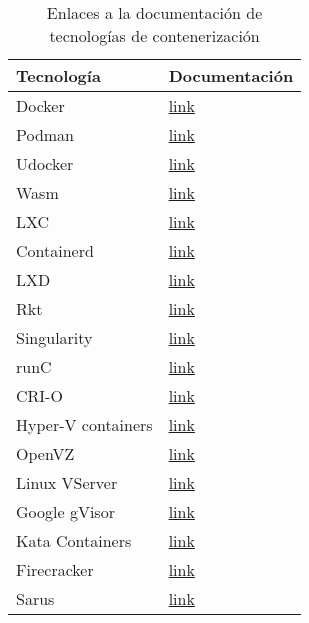 \begin{table}[H]
\centering
\scriptsize
\setlength{\tabcolsep}{3pt}
\renewcommand{\arraystretch}{1.1}
\begin{tabular}{|>{\raggedright\arraybackslash}p{4cm}|>{\centering\arraybackslash}p{2.5cm}|}
\hline
\centering\textbf{Tecnología} & \textbf{Documentación} \\
\hline
Docker & \href{https://docs.docker.com/}{link} \\
\hline
Podman & \href{https://podman.io/docs}{link} \\
\hline
Udocker & \href{https://github.com/indigo-dc/udocker}{link} \\
\hline
Wasm & \href{https://webassembly.org/docs/faq/}{link} \\
\hline
LXC & \href{https://linuxcontainers.org/incus/docs/main/}{link} \\
\hline
Containerd & \href{https://containerd.io/docs/}{link} \\
\hline
LXD & \href{https://linuxcontainers.org/incus/docs/main/}{link} \\
\hline
Rkt & \href{https://github.com/rkt/rkt}{link} \\
\hline
Singularity & \href{https://docs.sylabs.io/guides/4.3/user-guide/}{link} \\
\hline
runC & \href{https://github.com/opencontainers/runc}{link} \\
\hline
CRI-O & \href{https://github.com/cri-o/cri-o}{link} \\
\hline
Hyper-V containers & \href{https://docs.microsoft.com/en-us/virtualization/windowscontainers/}{link} \\
\hline
OpenVZ & \href{https://openvz.org/}{link} \\
\hline
Linux VServer & \href{http://linux-vserver.org/Documentation}{link} \\
\hline
Google gVisor & \href{https://gvisor.dev/docs/}{link} \\
\hline
Kata Containers & \href{https://katacontainers.io/docs/}{link} \\
\hline
Firecracker & \href{https://firecracker-microvm.github.io/}{link} \\
\hline
Sarus & \href{https://github.com/eth-cscs/sarus}{link} \\
\hline
\end{tabular}
\caption{Enlaces a la documentación de tecnologías de contenerización}
\label{tab:documentacion-tecnologias}
\end{table}